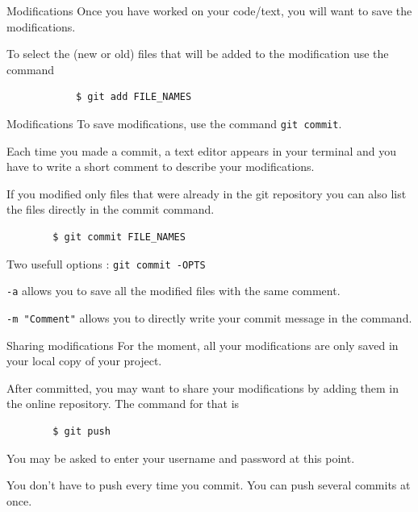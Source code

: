 \documentclass{beamer}
\begin{document}
	\begin{frame}[fragile]{Modifications}
		Once you have worked on your code/text, you will want to save the modifications. \newline
		
		To select the (new or old) files that will be added to the modification use the command
		\begin{verbatim}
			$ git add FILE_NAMES
		\end{verbatim}
	\end{frame}

	\begin{frame}[fragile]{Modifications}	
		To save modifications, use the command \texttt{git commit}. \newline 
		
		Each time you made a commit, a text editor appears in your terminal and you have to write a short comment to describe your modifications. \newline
		
		If you modified only files that were already in the git repository you can also list the files directly in the commit command. 
		\begin{verbatim}
		$ git commit FILE_NAMES
		\end{verbatim}
		
		Two usefull options : \texttt{git commit -OPTS}
		
		\texttt{-a} allows you to save all the modified files with the same comment.
		 
		\texttt{-m "Comment"} allows you to directly write your commit message in the command. 		
	\end{frame}

	\begin{frame}[fragile]{Sharing modifications}
		For the moment, all your modifications are only saved in your local copy of your project. 
		
		After committed, you may want to share your modifications by adding them in the online repository. The command for that is 
		
		\begin{verbatim}
		$ git push
		\end{verbatim}
		
		You may be asked to enter your username and password at this point.
		
		You don't have to push every time you commit. You can push several commits at once. 
	\end{frame}
	
\end{document}
